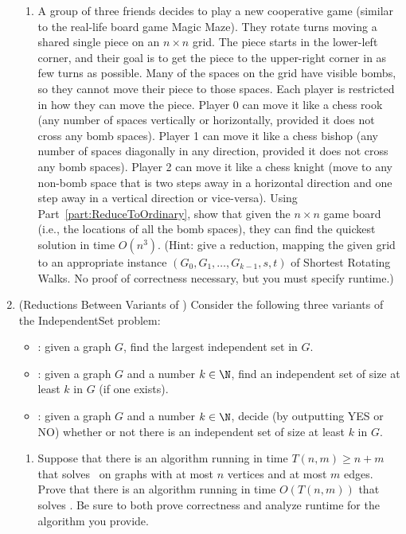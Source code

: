 \documentclass[11pt]{article}
\begin{document}
\begin{enumerate}
\begin{enumerate}
    
    \item 
        A group of three friends decides to play a new cooperative game (similar to the real-life board game Magic Maze).  They rotate turns moving a shared single piece on an $n\times n$ grid.  The piece starts in the lower-left corner, and their goal is to get the piece to the upper-right corner in as few turns as possible.  Many of the spaces on the grid have visible bombs, so they cannot move their piece to those spaces.  Each player is restricted in how they can move the piece.  Player 0 can move it like a chess rook (any number of spaces vertically or horizontally, provided it does not cross any bomb spaces). Player 1 can move it like a chess bishop (any number of spaces diagonally in any direction, provided it does not cross any bomb spaces).  Player 2 can move it like a chess knight (move to any non-bomb space that is two steps away in a horizontal direction and one step away in a vertical direction or vice-versa).   Using Part~\ref{part:ReduceToOrdinary}, show that given the $n\times n$ game board (i.e., the locations of all the bomb spaces), they can find the quickest solution in time $O(n^3)$.  
        (Hint: give a reduction, mapping the given grid to an appropriate instance $(G_0,G_1,\ldots,G_{k-1},s,t)$ of Shortest Rotating Walks. No proof of correctness necessary, but you must specify runtime.)


 



 \end{enumerate}

  \item (Reductions Between Variants of \IndependentSet) 
 Consider the following three variants of the IndependentSet problem:
 \begin{itemize}
     \item \IndependentSetOptimizationSearch: given a graph $G$, find the largest independent set in $G$.
     \item \IndependentSetThresholdSearch: given a graph $G$ and a number $k\in \N$, find an independent set of size at least $k$ in $G$ (if one exists).
     \item \IndependentSetThresholdDecision: given a graph $G$ and a number $k\in \N$, decide (by outputting YES or NO) whether or not there is an independent set of size at least $k$ in $G$. 
 \end{itemize}

 \begin{enumerate}
 \item Suppose that there is an algorithm running in time $T(n,m)\geq n+m$ that solves \IndependentSetOptimizationSearch\ on graphs with at most $n$ vertices and at most $m$ edges.  Prove that there is an algorithm running in time $O(T(n,m))$ that solves \IndependentSetThresholdDecision. Be sure to both prove correctness and analyze runtime for the algorithm you provide.



\end{enumerate}
\end{enumerate}
\end{document}
